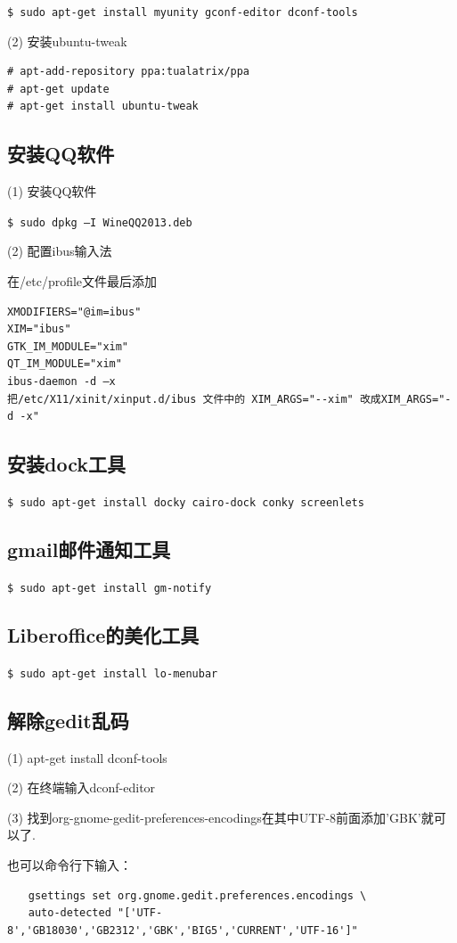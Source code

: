 \verb"$ sudo apt-get install myunity gconf-editor dconf-tools"

(2) 安装ubuntu-tweak
\begin{verbatim}
# apt-add-repository ppa:tualatrix/ppa
# apt-get update
# apt-get install ubuntu-tweak
\end{verbatim}

\subsection{安装QQ软件}
(1) 安装QQ软件

\verb"$ sudo dpkg –I WineQQ2013.deb"

(2) 配置ibus输入法

在/etc/profile文件最后添加
\begin{verbatim}
XMODIFIERS="@im=ibus"
XIM="ibus"
GTK_IM_MODULE="xim"
QT_IM_MODULE="xim"
ibus-daemon -d –x
把/etc/X11/xinit/xinput.d/ibus 文件中的 XIM_ARGS="--xim" 改成XIM_ARGS="-d -x"
\end{verbatim}

\subsection{安装dock工具}
\verb"$ sudo apt-get install docky cairo-dock conky screenlets"

\subsection{gmail邮件通知工具}
\verb"$ sudo apt-get install gm-notify"

\subsection{Liberoffice的美化工具}
\verb"$ sudo apt-get install lo-menubar"

\subsection{解除gedit乱码}
(1) apt-get install dconf-tools

(2) 在终端输入dconf-editor

(3) 找到org-gnome-gedit-preferences-encodings在其中UTF-8前面添加’GBK’就可以了.

也可以命令行下输入：
\begin{verbatim}
　　gsettings set org.gnome.gedit.preferences.encodings \ 
　　auto-detected "['UTF-8','GB18030','GB2312','GBK','BIG5','CURRENT','UTF-16']"
\end{verbatim}

